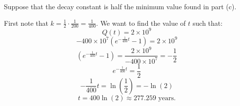\documentclass[handout, nooutcomes]{ximera}
\renewenvironment{freeResponse}{
\ifhandout\setbox0\vbox\bgroup\else
\begin{trivlist}\item[\hskip \labelsep\bfseries Solution:\hspace{2ex}]
\fi}
{\ifhandout\egroup\else
\end{trivlist}
\fi}
\begin{document}
\begin{problem}
\begin{enumerate}
	\item  Suppose that the decay constant is half the minimum value found in part (c).

		\begin{freeResponse}
		First note that $k = \frac{1}{2} \cdot \frac{1}{200} = \frac{1}{400}$.
		We want to find the value of $t$ such that:
			\begin{equation*}
			Q(t) = 2 \times 10^9
			\end{equation*}
			\begin{equation*}
			- 400 \times 10^7 \left(e^{-\frac{1}{400}t}-1 \right) = 2 \times 10^9
			\end{equation*}
			\begin{equation*}
			\left(e^{-\frac{1}{400}t}-1 \right) = \frac{2 \times 10^9}{-400 \times 10^7} = - \frac{1}{2}
			\end{equation*}
			\begin{equation*}
			e^{-\frac{1}{400}t} = \frac{1}{2}
			\end{equation*}
			\begin{equation*}
			-\frac{1}{400}t=\ln \left(\frac{1}{2} \right) = -\ln(2)
			\end{equation*}
			\begin{equation*}
			t = 400 \ln(2) \approx 277.259 \text{ years}.
			\end{equation*}
		\end{freeResponse}
	\end{enumerate}
\end{problem}
\end{document}
